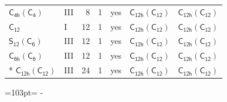 \documentclass[10pt,a4paper]{article}
\newcommand{\needspace}[1]{\par\penalty-100\begingroup\dimen0=#1\relax\dimen2=\pagegoal
  \advance\dimen2-\pagetotal\ifdim\dimen0>\dimen2\relax\ifdim\dimen2>0pt\vfil\break\fi\fi
  \endgroup}
\numberwithin{equation}{section}
\newcommand{\grp}[1]{\mathsf{#1}}
\begin{document}
{\begin{longtable}{@{}llrrlll@{}}
\href{C4h-C4.pdf}{$\grp{C_{4h}}(\grp{C_{4}})$} & III & 8 & 1 & yes & \href{C12h-C12.pdf}{$\grp{C_{12h}}(\grp{C_{12}})$} & \href{C12h-C12.pdf}{$\grp{C_{12h}}(\grp{C_{12}})$}\\
\href{../../../rotation/data/pdf/C12.pdf}{$\grp{C_{12}}$} & I & 12 & 1 & yes & \href{C12h-C12.pdf}{$\grp{C_{12h}}(\grp{C_{12}})$} & \href{C12h-C12.pdf}{$\grp{C_{12h}}(\grp{C_{12}})$}\\
\href{S12-C6.pdf}{$\grp{S_{12}}(\grp{C_{6}})$} & III & 12 & 1 & yes & \href{C12h-C12.pdf}{$\grp{C_{12h}}(\grp{C_{12}})$} & \href{C12h-C12.pdf}{$\grp{C_{12h}}(\grp{C_{12}})$}\\
\href{C6h-C6.pdf}{$\grp{C_{6h}}(\grp{C_{6}})$} & III & 12 & 1 & yes & \href{C12h-C12.pdf}{$\grp{C_{12h}}(\grp{C_{12}})$} & \href{C12h-C12.pdf}{$\grp{C_{12h}}(\grp{C_{12}})$}\\*
\href{C12h-C12.pdf}{$\grp{C_{12h}}(\grp{C_{12}})$} & III & 24 & 1 & yes & \href{C12h-C12.pdf}{$\grp{C_{12h}}(\grp{C_{12}})$} & \href{C12h-C12.pdf}{$\grp{C_{12h}}(\grp{C_{12}})$}\\
\bottomrule\end{longtable}}
\needspace{103pt}
\end{document}
